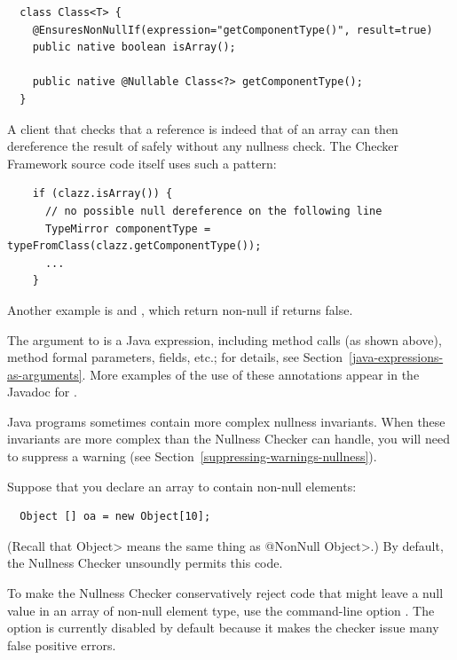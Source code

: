 \begin{Verbatim}
  class Class<T> {
    @EnsuresNonNullIf(expression="getComponentType()", result=true)
    public native boolean isArray();

    public native @Nullable Class<?> getComponentType();
  }
\end{Verbatim}

A client that checks that a  reference is indeed that of an array
can then dereference the result of  safely
without any nullness check.  The Checker Framework source code itself
uses such a pattern:

\begin{Verbatim}
    if (clazz.isArray()) {
      // no possible null dereference on the following line
      TypeMirror componentType = typeFromClass(clazz.getComponentType());
      ...
    }
\end{Verbatim}

Another example is 
and , which return
non-null if 
returns false.

The argument to  is a Java expression, including method calls
(as shown above), method formal parameters, fields, etc.; for details, see
Section~\ref{java-expressions-as-arguments}.
More examples of the use of these annotations appear in the Javadoc for
.

Java programs sometimes contain more complex nullness invariants.  When
these invariants are more complex than the Nullness Checker can handle, you
will need to suppress a warning (see
Section~\ref{suppressing-warnings-nullness}).



Suppose that you declare an array to contain non-null elements:

\begin{Verbatim}
  Object [] oa = new Object[10];
\end{Verbatim}

\noindent
(Recall that \<Object> means the same thing as \<@NonNull Object>.)
By default, the Nullness Checker unsoundly permits this code.

To make the Nullness Checker conservatively reject code that might leave a
null value in an array of non-null element type, use the command-line option
.  The option is currently disabled by default
because it makes the checker issue many false positive errors.

